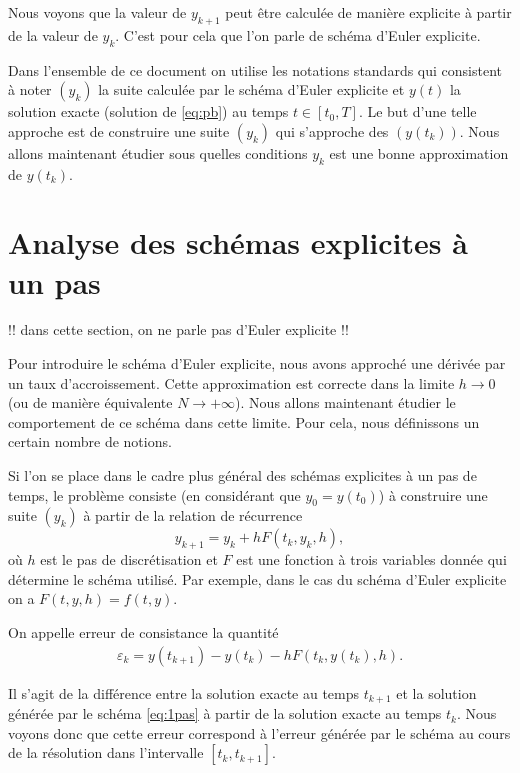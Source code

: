 \documentclass[12pt,a4paper,twoside]{article}
\begin{document}
Nous voyons que la valeur de $y_{k+1}$ peut \^etre calcul\'ee de mani\`ere explicite 
\`a partir de la valeur de $y_k$. C'est pour cela que l'on parle de sch\'ema
d'Euler explicite.


Dans l'ensemble de ce document on utilise les notations standards qui consistent
\`a noter $(y_k)$ la suite calcul\'ee par le sch\'ema d'Euler explicite
et $y(t)$ la solution exacte (solution de \eqref{eq:pb}) au temps $t \in [t_0,T]$.
Le but d'une telle approche est de construire une suite $(y_k)$ qui s'approche
des $(y(t_k))$. Nous allons maintenant \'etudier sous quelles conditions
$y_k$ est une bonne approximation de $y(t_k)$.


\section{Analyse des sch\'emas explicites \`a un pas}

!! dans cette section, on ne parle pas d'Euler explicite !!

Pour introduire le sch\'ema d'Euler explicite, nous avons approch\'e une d\'eriv\'ee
par un taux d'accroissement. Cette approximation est correcte dans la limite
$h \to 0$ (ou de mani\`ere \'equivalente $N \to +\infty$). 
Nous allons maintenant \'etudier le comportement de ce sch\'ema dans cette limite.
Pour cela, nous d\'efinissons un certain nombre de notions.


Si l'on se place dans le cadre plus g\'en\'eral des sch\'emas explicites \`a un pas de temps,
le probl\`eme consiste (en consid\'erant que $y_0 = y(t_0)$) 
\`a construire une suite $(y_k)$ \`a partir de la relation de r\'ecurrence
\begin{equation}
  \label{eq:1pas}
  y_{k+1} = y_k + h F(t_k,y_k,h) ,
\end{equation}
o\`u $h$ est le pas de discr\'etisation et $F$ est une fonction \`a trois variables
donn\'ee qui d\'etermine le sch\'ema utilis\'e.
Par exemple, dans le cas du sch\'ema d'Euler explicite on a $F(t,y,h) = f(t,y)$.


\begin{definition}
  On appelle erreur de consistance la quantit\'e
  \begin{align*}
    \varepsilon_k = y(t_{k+1}) - y(t_k) - h F(t_k , y(t_k) , h ) .
  \end{align*}
\end{definition}
Il s'agit de la diff\'erence entre la solution exacte au temps $t_{k+1}$
et la solution g\'en\'er\'ee par le sch\'ema \eqref{eq:1pas}
\`a partir de la solution exacte au temps $t_k$.
Nous voyons donc que cette erreur correspond \`a l'erreur g\'en\'er\'ee
par le sch\'ema au cours de la r\'esolution dans l'intervalle
$[t_k , t_{k+1}]$.
\end{document}
